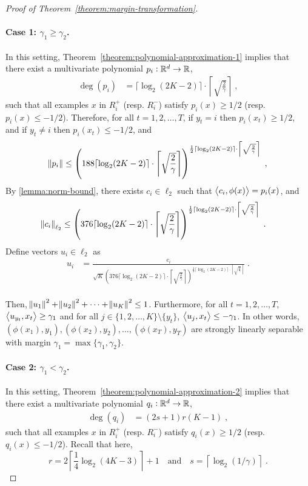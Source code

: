 \begin{proof}[Proof of Theorem~\ref{theorem:margin-transformation}]
\paragraph{Case 1: $\gamma_1 \geq \gamma_2$.} In this setting, Theorem~\ref{theorem:polynomial-approximation-1}
implies that there exist a multivariate polynomial $p_i:\mathbb{R}^d \to \mathbb{R}$,
\begin{align*}
\deg(p_i) & = \lceil \log_2(2K-2) \rceil \cdot \left\lceil \sqrt{\frac{2}{\gamma}} \right\rceil \; ,
\end{align*}
such that all examples $x$ in $R_i^+$ (resp. $R_i^-$) satisfy $p_i(x) \geq 1/2$
(resp. $p_i(x) \leq -1/2$).
Therefore, for all $t=1,2,\dots,T$, if $y_t = i$ then $p_i(x_t) \ge 1/2$,
 and if $y_t \neq i$ then $p_i(x_t) \le -1/2$, and
\begin{align*}
\norm{p_i} & \le \left(188 \lceil \log_2(2K-2) \rceil \cdot \left \lceil \sqrt{\frac{2}{\gamma}} \right \rceil \right)^{\frac{1}{2} \lceil \log_2(2K-2) \rceil
\cdot \left \lceil \sqrt{\frac{2}{\gamma}} \right \rceil} \; , \\
\end{align*}
By \autoref{lemma:norm-bound}, there exists $c_i \in \ell_2$ such that
$\left\langle c_i, \phi(x) \right\rangle = p_i(x)$, and
\begin{align*}
\norm{c_i}_{\ell_2}
& \le \left(376 \lceil \log_2(2K-2) \rceil \cdot \left \lceil \sqrt{\frac{2}{\gamma}} \right \rceil \right)^{\frac{1}{2} \lceil \log_2(2K-2) \rceil
\cdot \left \lceil \sqrt{\frac{2}{\gamma}} \right \rceil} \; .
\end{align*}
Define vectors $u_i \in \ell_2$ as
\begin{align*}
u_i & = \frac{c_i}{\sqrt{K} \left(376 \lceil \log_2(2K-2) \rceil \cdot \left \lceil \sqrt{\frac{2}{\gamma}} \right \rceil \right)^{\frac{1}{2} \lceil \log_2(2K-2) \rceil
\cdot \left \lceil \sqrt{\frac{2}{\gamma}} \right \rceil}} \; . \\
\end{align*}

Then, $\norm{u_1}^2 + \norm{u_2}^2 + \dots + \norm{u_K}^2 \le 1$.
Furthermore, for all $t=1,2,\dots,T$, $\left\langle u_{y_t}, x_t \right\rangle \ge \gamma_1$
and for all $j \in \{1,2,\dots,K\} \setminus \{y_t\}$,
$\left\langle u_j, x_t \right\rangle \le - \gamma_1$. In other words,
$(\phi(x_1), y_1), (\phi(x_2), y_2), \dots, (\phi(x_T), y_T)$ are
strongly linearly separable with margin $\gamma_1 = \max\{\gamma_1, \gamma_2\}$.

\paragraph{Case 2: $\gamma_1 < \gamma_2$.} In this setting, Theorem~\ref{theorem:polynomial-approximation-2}
implies that there exist a multivariate polynomial $q_i:\mathbb{R}^d \to \mathbb{R}$,
\begin{align*}
\deg(q_i) & = (2s+1) r(K-1) \; ,
\end{align*}
such that all examples $x$ in $R_i^+$ (resp. $R_i^-$) satisfy $q_i(x) \geq 1/2$
(resp. $q_i(x) \leq -1/2$). Recall that here,
\[
r = 2 \left\lceil \frac{1}{4} \log_2(4K - 3) \right\rceil + 1 \quad \text{and} \quad s = \left \lceil \log_2(1/\gamma) \right \rceil \; .
\]



\end{proof}
